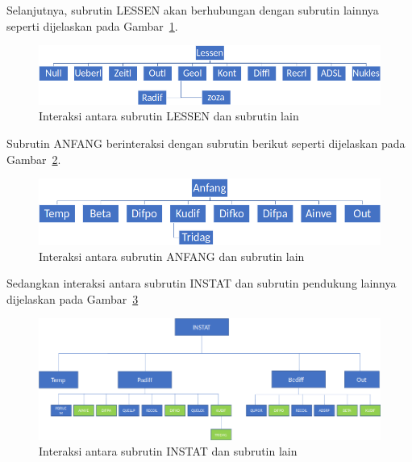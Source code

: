 \documentclass[a4paper,11pt]{report}
\renewcommand{\figurename}{Gambar}
\begin{document}
Selanjutnya, subrutin LESSEN akan berhubungan dengan subrutin lainnya seperti dijelaskan pada \figurename~\ref{fig:interaction1}.
\begin{figure}[h!]
  \begin{center}
    \includegraphics[scale=.35]{pics/intertaction1.png}
    \caption{Interaksi antara subrutin LESSEN dan subrutin lain}
    \label{fig:interaction1}
  \end{center}
\end{figure}

Subrutin ANFANG berinteraksi dengan subrutin berikut seperti dijelaskan pada \figurename~\ref{fig:interaction2}.
\begin{figure}[h!]
  \begin{center}
    \includegraphics[scale=.35]{pics/intertaction2.png}
    \caption{Interaksi antara subrutin ANFANG dan subrutin lain}
    \label{fig:interaction2}
  \end{center}
\end{figure}

Sedangkan interaksi antara subrutin INSTAT dan subrutin pendukung lainnya dijelaskan pada \figurename~\ref{fig:interaction3}
\begin{figure}[h!]
  \begin{center}
    \includegraphics[scale=.4]{pics/intertaction3.png}
    \caption{Interaksi antara subrutin INSTAT dan subrutin lain}
    \label{fig:interaction3}
  \end{center}
\end{figure}
\end{document}
